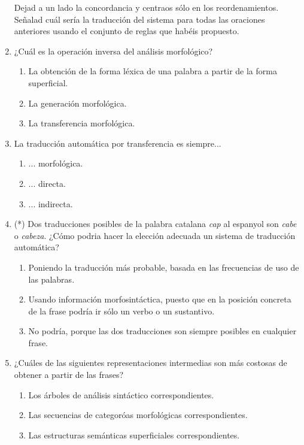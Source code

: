 \begin{enumerate}
Dejad a un lado la concordancia y centraos sólo en los reordenamientos. Señalad cuál sería la traducción del sistema para todas las oraciones anteriores usando el conjunto de reglas que habéis propuesto. 

\item ¿Cuál es la operación inversa del análisis morfológico? \begin{enumerate} \item La obtención de la forma léxica de una palabra a partir de la forma superficial. \item La generación morfológica. \item La transferencia morfológica. \end{enumerate} 

\item La traducción automática por transferencia es siempre... \begin{enumerate} \item ... morfológica. \item ... directa. \item ... indirecta. \end{enumerate} 

\item (*) Dos traducciones posibles de la palabra catalana \emph{cap} al espanyol son \emph{cabe} o \emph{cabeza}. ¿Cómo podria hacer la elección adecuada un sistema de traducción automática? \begin{enumerate} \item Poniendo la traducción más probable, basada en las frecuencias de uso de las palabras. \item Usando información morfosintáctica, puesto que en la posición concreta de la frase podría ir sólo un verbo o un sustantivo. \item No podría, porque las dos traducciones son siempre posibles en cualquier frase. \end{enumerate} 

\item ¿Cuáles de las siguientes representaciones intermedias son más costosas de obtener a partir de las frases? \begin{enumerate} \item Los árboles de análisis sintáctico correspondientes. \item Las secuencias de categoróas morfológicas correspondientes. \item Las estructuras semánticas superficiales correspondientes. \end{enumerate} 


\end{enumerate}
